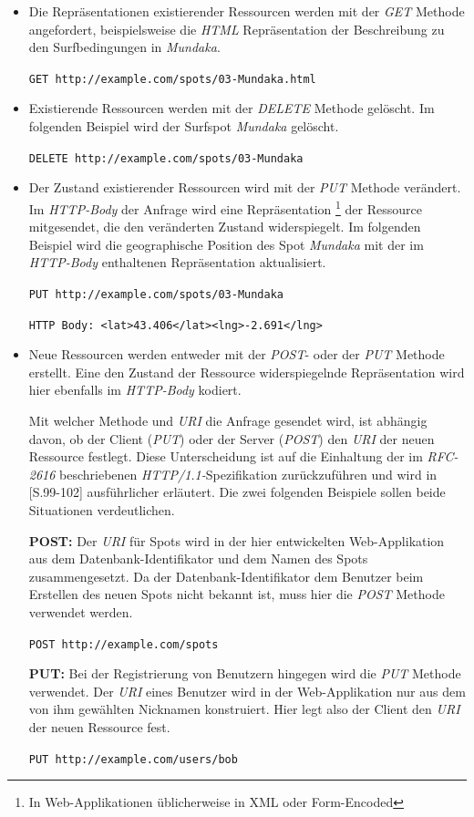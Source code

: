 \begin{itemize}
\item Die Repräsentationen existierender Ressourcen werden mit der
  \textit{GET} Methode angefordert, beispielsweise die \textit{HTML}
  Repräsentation der Beschreibung zu den Surfbedingungen in
  \textit{Mundaka}.

  \texttt{GET http://example.com/spots/03-Mundaka.html}

\item Existierende Ressourcen werden mit der \textit{DELETE} Methode
  gelöscht. Im folgenden Beispiel wird der Surfspot \textit{Mundaka}
  gelöscht.

  \texttt{DELETE http://example.com/spots/03-Mundaka}

\item Der Zustand existierender Ressourcen wird mit der \textit{PUT}
  Methode verändert. Im \textit{HTTP-Body} der Anfrage wird eine
  Repräsentation \footnote{In Web-Applikationen üblicherweise in XML
    oder Form-Encoded} der Ressource mitgesendet, die den veränderten
  Zustand widerspiegelt. Im folgenden Beispiel wird die geographische
  Position des Spot \textit{Mundaka} mit der im \textit{HTTP-Body}
  enthaltenen Repräsentation aktualisiert.

  \texttt{PUT http://example.com/spots/03-Mundaka}

  \texttt{HTTP Body: <lat>43.406</lat><lng>-2.691</lng>}


\item Neue Ressourcen werden entweder mit der \textit{POST}- oder der
  \textit{PUT} Methode erstellt. Eine den Zustand der Ressource
  widerspiegelnde Repräsentation wird hier ebenfalls im
  \textit{HTTP-Body} kodiert.

  Mit welcher Methode und \textit{URI} die Anfrage gesendet wird, ist
  abhängig davon, ob der Client (\textit{PUT}) oder der Server
  (\textit{POST}) den \textit{URI} der neuen Ressource festlegt. Diese
  Unterscheidung ist auf die Einhaltung der im \textit{RFC-2616}
   beschriebenen
  \textit{HTTP/1.1-}Spezifikation zurückzuführen und wird in
  \cite{Richardson07}[S.99-102] ausführlicher erläutert. Die zwei
  folgenden Beispiele sollen beide Situationen verdeutlichen.

  \textbf{POST:} Der \textit{URI} für Spots wird in der hier
  entwickelten Web-Applikation aus dem Datenbank-Identifikator und dem
  Namen des Spots zusammengesetzt. Da der Datenbank-Identifikator dem
  Benutzer beim Erstellen des neuen Spots nicht bekannt ist, muss hier
  die \textit{POST} Methode verwendet werden.

  \texttt{POST http://example.com/spots}

  \textbf{PUT:} Bei der Registrierung von Benutzern hingegen wird die
  \textit{PUT} Methode verwendet. Der \textit{URI} eines Benutzer wird
  in der Web-Applikation nur aus dem von ihm gewählten Nicknamen
  konstruiert. Hier legt also der Client den \textit{URI} der neuen
  Ressource fest.

  \texttt{PUT http://example.com/users/bob}

\end{itemize}

